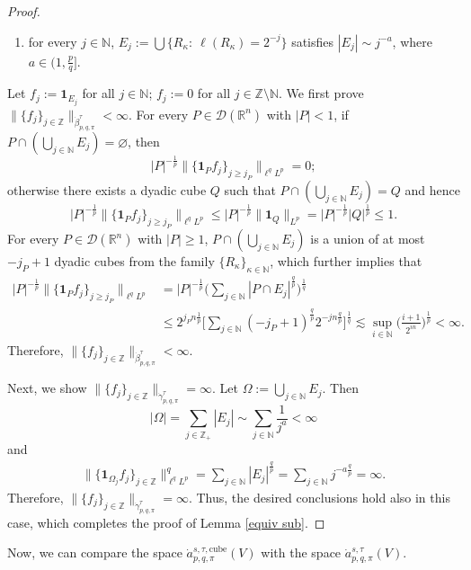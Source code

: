 \documentclass[11pt, reqno]{amsart}
\theoremstyle{definition}
\theoremstyle{remark}
\numberwithin{equation}{section}
\newcommand{\N}{\mathbb N}
\newcommand{\Z}{\mathbb Z}
\newcommand{\one}{\mathbf{1}}
\begin{document}
\begin{proof}
\begin{enumerate}[\rm(i)]
\item for every $j\in\mathbb N$,
$E_j:=\bigcup\{R_\kappa:\ \ell(R_\kappa) = 2^{-j} \}$
satisfies $|E_j| \sim j^{-a}$, where $a\in(1,\frac pq]$.
\end{enumerate}
Let $f_j:=\mathbf 1_{E_j}$
for all $j\in\mathbb N$;
$f_j:=0$ for all $j\in\mathbb Z\setminus\mathbb N$.
We first prove $\|\{f_j\}_{j\in\mathbb Z}\|_{\dot\beta^\tau_{p,q,\pi}}<\infty$.
For every $P\in\mathscr D(\mathbb R^n)$ with $|P|< 1$,
if $P\cap(\bigcup_{j\in\mathbb N} E_j)=\varnothing$, then
$$
|P|^{-\frac1p} \big\|\{\one_P f_j\}_{j\geq j_P}\big\|_{\ell^q L^p}=0;
$$
otherwise there exists a dyadic cube $Q$ such that
$P \cap (\bigcup_{j\in\mathbb N} E_j) = Q$ and hence
$$
|P|^{-\frac1p} \big\|\{\one_P f_j\}_{j\geq j_P}\big\|_{\ell^q L^p}
\leq |P|^{-\frac1p} \|\mathbf 1_Q\|_{L^p}
= |P|^{-\frac1p} |Q|^{\frac 1p}
\leq 1.
$$
For every $P\in\mathscr D(\mathbb R^n)$ with $|P|\geq 1$,
$P\cap(\bigcup_{j\in\mathbb N} E_j)$ is a union of at most $-j_P+1$ dyadic cubes
from the family $\{R_\kappa\}_{\kappa\in\mathbb N}$,
which further implies that
\begin{align*}
|P|^{-\frac1p} \big\|\{\one_P f_j\}_{j\geq j_P}\big\|_{\ell^q L^p}
&= |P|^{-\frac1p} \Bigg(\sum_{j\in\mathbb N} |P\cap E_j|^{\frac qp}\Bigg)^{\frac 1q}\\
&\leq 2^{j_Pn\frac1p}
\Bigg[\sum_{j\in\mathbb N} (-j_P+1)^{\frac qp}
2^{-jn\frac qp} \Bigg]^{\frac 1q}
\lesssim \sup_{i\in\N} \bigg(\frac{i+1}{2^{in}}\bigg)^{\frac 1p}<\infty.
\end{align*}
Therefore, $\|\{f_j\}_{j\in\mathbb Z}\|_{\dot\beta^\tau_{p,q,\pi}}<\infty$.

Next, we show $\|\{f_j\}_{j\in\mathbb Z}\|_{\dot\gamma^\tau_{p,q,\pi}}=\infty$.
Let $\Omega:=\bigcup_{j\in\mathbb N} E_j$.
Then
$$
|\Omega|=\sum_{j\in\mathbb Z_+}|E_j|
\sim \sum_{j\in\mathbb N} \frac1{j^a} <\infty
$$
and
\begin{align*}
\big\|\{\one_{\Omega_j} f_j\}_{j\in\Z}\big\|_{\ell^q L^p}^q
=\sum_{j\in\mathbb N} |E_j|^{\frac qp}
=\sum_{j\in\mathbb N} j^{-a\frac qp}
=\infty.
\end{align*}
Therefore, $\|\{f_j\}_{j\in\mathbb Z}\|_{\dot\gamma^\tau_{p,q,\pi}}=\infty$.
Thus, the desired conclusions hold also in this case, which completes
the proof of Lemma \ref{equiv sub}.
\end{proof}

Now, we can compare the space $\dot a^{s,\tau,\mathrm{cube}}_{p,q,\pi}(V)$
with the space $\dot a^{s,\tau}_{p,q,\pi}(V)$.
\end{document}
